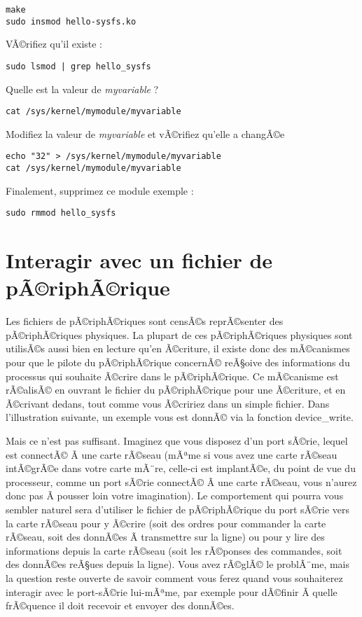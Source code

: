 \documentclass[11pt]{article}
\begin{document}
\begin{verbatim}
make
sudo insmod hello-sysfs.ko
\end{verbatim}

VÃ©rifiez qu'il existe :

\begin{verbatim}
sudo lsmod | grep hello_sysfs
\end{verbatim}

Quelle est la valeur de \emph{myvariable} ?

\begin{verbatim}
cat /sys/kernel/mymodule/myvariable
\end{verbatim}

Modifiez la valeur de \emph{myvariable} et vÃ©rifiez qu'elle a changÃ©e

\begin{verbatim}
echo "32" > /sys/kernel/mymodule/myvariable
cat /sys/kernel/mymodule/myvariable
\end{verbatim}

Finalement, supprimez ce module exemple :

\begin{verbatim}
sudo rmmod hello_sysfs
\end{verbatim}

\section*{Interagir avec un fichier de pÃ©riphÃ©rique}
\label{sec-9}

Les fichiers de pÃ©riphÃ©riques sont censÃ©s reprÃ©senter des pÃ©riphÃ©riques physiques. La plupart de ces pÃ©riphÃ©riques physiques sont utilisÃ©s aussi bien en lecture qu'en Ã©criture, il existe donc des mÃ©canismes pour que le pilote du pÃ©riphÃ©rique concernÃ© reÃ§oive des informations du processus qui souhaite Ã©crire dans le pÃ©riphÃ©rique. Ce mÃ©canisme est rÃ©alisÃ© en ouvrant le fichier du pÃ©riphÃ©rique pour une Ã©criture, et en Ã©crivant dedans, tout comme vous Ã©cririez dans un simple fichier. Dans l'illustration suivante, un exemple vous est donnÃ© via la fonction device\_write.

Mais ce n'est pas suffisant. Imaginez que vous disposez d'un port sÃ©rie, lequel est connectÃ© Ã  une carte rÃ©seau (mÃªme si vous avez une carte rÃ©seau intÃ©grÃ©e dans votre carte mÃ¨re, celle-ci est implantÃ©e, du point de vue du processeur, comme un port sÃ©rie connectÃ© Ã  une carte rÃ©seau, vous n'aurez donc pas Ã  pousser loin votre imagination). Le comportement qui pourra vous sembler naturel sera d'utiliser le fichier de pÃ©riphÃ©rique du port sÃ©rie vers la carte rÃ©seau pour y Ã©crire (soit des ordres pour commander la carte rÃ©seau, soit des donnÃ©es Ã  transmettre sur la ligne) ou pour y lire des informations depuis la carte rÃ©seau (soit les rÃ©ponses des commandes, soit des donnÃ©es reÃ§ues depuis la ligne). Vous avez rÃ©glÃ© le problÃ¨me, mais la question reste ouverte de savoir comment vous ferez quand vous souhaiterez interagir avec le port-sÃ©rie lui-mÃªme, par exemple pour dÃ©finir Ã  quelle frÃ©quence il doit recevoir et envoyer des donnÃ©es.
\end{document}
